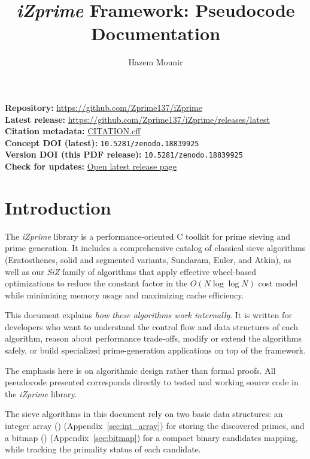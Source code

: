 \documentclass{article}
\newcommand{\RepoURL}{https://github.com/Zprime137/iZprime}
\newcommand{\LatestReleaseURL}{https://github.com/Zprime137/iZprime/releases/latest}
\newcommand{\CitationURL}{https://github.com/Zprime137/iZprime/blob/main/CITATION.cff}
\newcommand{\ConceptDOI}{10.5281/zenodo.18839925}
\newcommand{\VersionDOI}{10.5281/zenodo.18839925}
\begin{document}


\title{\emph{iZprime} Framework: Pseudocode Documentation}
\author{Hazem Mounir}
\maketitle

\noindent\textbf{Repository:} \href{\RepoURL}{\RepoURL}\\
\textbf{Latest release:} \href{\LatestReleaseURL}{\LatestReleaseURL}\\
\textbf{Citation metadata:} \href{\CitationURL}{CITATION.cff}\\
\textbf{Concept DOI (latest):} \texttt{\ConceptDOI}\\
\textbf{Version DOI (this PDF release):} \texttt{\VersionDOI}\\
\textbf{Check for updates:} \href{\LatestReleaseURL}{Open latest release page}

\section*{Introduction}

The \emph{iZprime} library is a performance-oriented C toolkit for prime sieving and prime generation. It includes a comprehensive catalog of classical sieve algorithms (Eratosthenes, solid and segmented variants, Sundaram, Euler, and Atkin), as well as our \emph{SiZ} family of algorithms that apply effective wheel-based optimizations to reduce the constant factor in the $O(N \log \log N)$ cost model while minimizing memory usage and maximizing cache efficiency.

This document explains \emph{how these algorithms work internally}. It is written for developers who want to understand the control flow and data structures of each algorithm, reason about performance trade-offs, modify or extend the algorithms safely, or build specialized prime-generation applications on top of the framework.

The emphasis here is on algorithmic design rather than formal proofs. All pseudocode presented corresponds directly to tested and working source code in the \emph{iZprime} library.

The sieve algorithms in this document rely on two basic data structures: an integer array () (Appendix~\ref{sec:int_array}) for storing the discovered primes, and a bitmap () (Appendix~\ref{sec:bitmap}) for a compact binary candidates mapping, while tracking the primality status of each candidate.
\end{document}
